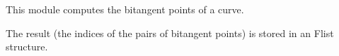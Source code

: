 This module computes the bitangent points of a curve.

\medskip
The result (the indices of the pairs of bitangent points) is stored 
in an Flist structure.
